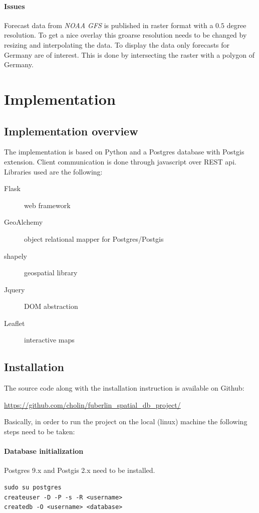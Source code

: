 \documentclass{scrartcl}
\begin{document}
\paragraph{Issues}
Forecast data from \textit{NOAA GFS} is published in raster format with a $0.5$
degree resolution. To get a nice overlay this groarse resolution needs to be
changed by resizing and interpolating the data. To display the data only
forecasts for Germany are of interest. This is done by intersecting the raster
with a polygon of Germany.



\section{Implementation}
\subsection{Implementation overview}
The implementation is based on Python and a Postgres database with Postgis
extension. Client communication is done through javascript over REST api.
Libraries used are the following:

\begin{description}
  \item [Flask] web framework
  \item [GeoAlchemy] object relational mapper for Postgres/Postgis
  \item [shapely] geospatial library
  \item [Jquery] DOM abstraction
  \item [Leaflet] interactive maps
\end{description}


\subsection{Installation}
The source code along with the installation instruction is available on Github:

\begin{center}
  \url{https://github.com/cholin/fuberlin_spatial_db_project/}
\end{center}

Basically, in order to run the project on the local (linux) machine the
following steps need to be taken:

\paragraph{Database initialization}
Postgres 9.x and Postgis 2.x need to be installed.
\begin{verbatim}
sudo su postgres
createuser -D -P -s -R <username>
createdb -O <username> <database>
\end{verbatim}
\end{document}
